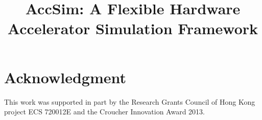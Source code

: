 \documentclass[conference]{IEEEtran}
\begin{document}
\title{AccSim: A Flexible Hardware Accelerator Simulation Framework}

\author{
}
\maketitle

\begin{abstract}

\end{abstract}
 








\section*{Acknowledgment}
This work was supported in part by the Research Grants Council of Hong Kong project ECS 720012E and
the Croucher Innovation Award 2013. 





\end{document}
